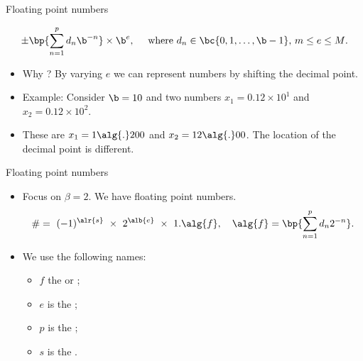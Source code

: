 \documentclass[11pt,xcolor={dvipsnames},aspectratio=159,hyperref={pdftex,pdfpagemode=UseNone,hidelinks,pdfdisplaydoctitle=true},usepdftitle=false]{beamer}
\begin{document}
\begin{frame}{Floating point numbers}

              \begin{align*}
                    \pm  \bp{\sum_{n=1}^p d_n \b^{-n}} \times  \b^e,\quad \text{            
                        where $d_n\in \bc{0,1,\ldots,\b-1}$, $m\leq e \leq M$.} 
            \end{align*}  
           
            \begin{itemize}  
            \item Why ? By varying $e$ we can represent numbers by shifting the decimal point. 
            \vspace{1.5cm}
            \item Example: Consider $\b=10$ and two numbers $x_1 = 0.12 \times 10^1$ and $x_2 = 0.12 \times 10^2$. 
            \item[] These are $x_1 = 1\alg{.}200$ and $x_2 = 12\alg{.}00$. The location of the decimal point is different.
    \end{itemize}
    \end{frame}

\begin{frame}{Floating point numbers}

    \begin{itemize}  
    \item Focus on $\beta = 2$. We have  floating point numbers.
    \begin{align*}
        \# = \ (-1)^{\alr{s}} \ \times \   2^{\alb{e}} \ \times \ 1.\alg{f} , \quad  \alg{f} = \bp{\sum_{n=1}^p d_n 2^{-n}}.
\end{align*}  
\item We use the following names:
\begin{itemize}
\item $f$ the  or ;
\item $e$ is the ;
\item $p$ is the ;
\item $s$ is the .
\end{itemize}
\end{itemize}
\end{frame}
\end{document}
